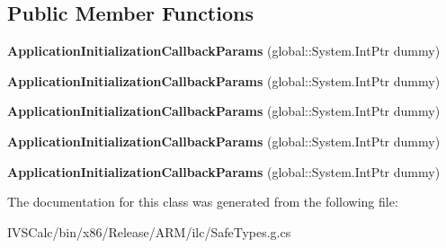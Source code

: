 \subsection*{Public Member Functions}
\begin{DoxyCompactItemize}
\item 
\mbox{\label{class_windows_1_1_u_i_1_1_xaml_1_1_application_initialization_callback_params_a3dc7e59cb130386763d4528b8e8f0b43}} 
{\bfseries Application\+Initialization\+Callback\+Params} (global\+::\+System.\+Int\+Ptr dummy)
\item 
\mbox{\label{class_windows_1_1_u_i_1_1_xaml_1_1_application_initialization_callback_params_a3dc7e59cb130386763d4528b8e8f0b43}} 
{\bfseries Application\+Initialization\+Callback\+Params} (global\+::\+System.\+Int\+Ptr dummy)
\item 
\mbox{\label{class_windows_1_1_u_i_1_1_xaml_1_1_application_initialization_callback_params_a3dc7e59cb130386763d4528b8e8f0b43}} 
{\bfseries Application\+Initialization\+Callback\+Params} (global\+::\+System.\+Int\+Ptr dummy)
\item 
\mbox{\label{class_windows_1_1_u_i_1_1_xaml_1_1_application_initialization_callback_params_a3dc7e59cb130386763d4528b8e8f0b43}} 
{\bfseries Application\+Initialization\+Callback\+Params} (global\+::\+System.\+Int\+Ptr dummy)
\item 
\mbox{\label{class_windows_1_1_u_i_1_1_xaml_1_1_application_initialization_callback_params_a3dc7e59cb130386763d4528b8e8f0b43}} 
{\bfseries Application\+Initialization\+Callback\+Params} (global\+::\+System.\+Int\+Ptr dummy)
\end{DoxyCompactItemize}


The documentation for this class was generated from the following file\+:\begin{DoxyCompactItemize}
\item 
I\+V\+S\+Calc/bin/x86/\+Release/\+A\+R\+M/ilc/Safe\+Types.\+g.\+cs\end{DoxyCompactItemize}
